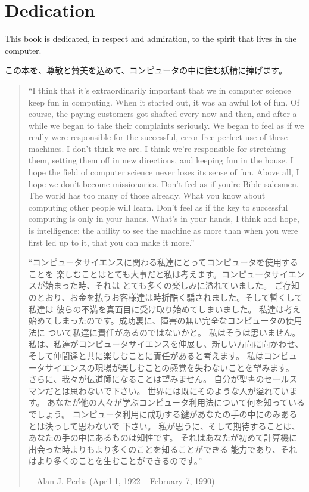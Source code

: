 \documentclass[8pt,oneside]{book}
\begin{document}
\label{Dedication}
\chapter*{Dedication}

This book is dedicated, in respect and admiration, to the spirit that lives in
the computer.

この本を、尊敬と賛美を込めて、コンピュータの中に住む妖精に捧げます。

\begin{quote}
``I think that it's extraordinarily important that we in computer science keep
fun in computing.  When it started out, it was an awful lot of fun. Of course,
the paying customers got shafted every now and then, and after a while we began
to take their complaints seriously.  We began to feel as if we really were
responsible for the successful, error-free perfect use of these machines. 
I don't think we are.  I think we're responsible for stretching them, setting
them off in new directions, and keeping fun in the house.  I hope the field of
computer science never loses its sense of fun.  Above all, I hope we don't
become missionaries.  Don't feel as if you're Bible salesmen.   The world has
too many of those already.  What you know about computing other people will
learn. Don't feel as if the key to successful computing is only in your hands.
What's in your hands, I think and hope, is intelligence: the ability to see the
machine as more than when you were first led up to it, that you can make it
more.''

``コンピュータサイエンスに関わる私達にとってコンピュータを使用することを
楽しむことはとても大事だと私は考えます。コンピュータサイエンスが始まった時、それは
とても多くの楽しみに溢れていました。
ご存知のとおり、お金を払うお客様達は時折酷く騙されました。そして暫くして私達は
彼らの不満を真面目に受け取り始めてしまいました。
私達は考え始めてしまったのです。成功裏に、障害の無い完全なコンピュータの使用法に
ついて私達に責任があるのではないかと。
私はそうは思いません。
私は、私達がコンピュータサイエンスを伸展し、新しい方向に向かわせ、
そして仲間達と共に楽しむことに責任があると考えます。
私はコンピュータサイエンスの現場が楽しむことの感覚を失わないことを望みます。
さらに、我々が伝道師になることは望みません。
自分が聖書のセールスマンだとは思わないで下さい。
世界には既にそのような人が溢れています。
あなたが他の人々が学ぶコンピュータ利用法について何を知っているでしょう。
コンピュータ利用に成功する鍵があなたの手の中にのみあるとは決っして思わないで
下さい。
 私が思うに、そして期待することは、あなたの手の中にあるものは知性です。
それはあなたが初めて計算機に出会った時よりもより多くのことを知ることができる
能力であり、それはより多くのことを生むことができるのです。''

\noindent
---Alan J. Perlis (April 1, 1922 -- February 7, 1990)
\end{quote}
\end{document}
